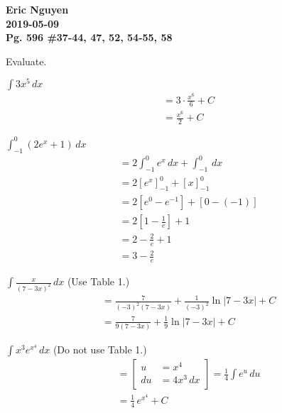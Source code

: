 \documentclass[12pt]{article}
\newenvironment{problem}[2][]{
    \begin{trivlist}
        \item[
            {\bfseries #1}
            {\bfseries #2.}
        ]
}{\end{trivlist}}
\newcommand{\assignment}{Pg. 596 \#37-44, 47, 52, 54-55, 58}
\newcommand{\name}{Eric Nguyen}
\newcommand{\duedate}{2019-05-09}
\newcommand{\details}{\noindent\textbf{\name \\\duedate \\\assignment}}
\newcommand{\Problem}[1]{\bigskip \noindent #1}
\newcommand{\dx}{\, dx}
\newcommand{\du}{\, du}
\newcommand{\subu}[2]{
\left[
\begin{alignedat}{1}
u &= #1 \\
du &= #2 \\
\end{alignedat}
\right] 
}
\begin{document}
\details

\Problem{Evaluate.}

\begin{problem}{37}
    $\displaystyle\int 3x^5 \dx$
    \begin{align}
        &= 3 \cdot \frac{x^6}{6} + C \\
        &= \frac{x^6}{2} + C
    \end{align}
\end{problem}

\begin{problem}{38}
    $\displaystyle\int_{-1}^0 \left(2e^x + 1\right) \dx$
    \begin{align}
        &= 2 \int_{-1}^0 e^x \dx + \int_{-1}^0 \dx \\
        &= 2 \left[e^x\right]_{-1}^0 + \left[x\right]_{-1}^0 \\
        &= 2 \left[e^0 - e^{-1}\right] + [0 - (-1)] \\
        &= 2 \left[1 - \frac{1}{e}\right] + 1 \\
        &= 2 - \frac{2}{e} + 1 \\
        &= 3 - \frac{2}{e}
    \end{align}
\end{problem}

\begin{problem}{39}
    $\displaystyle\int \frac{x}{\left(7 - 3x\right)^2} \dx$ \quad (Use Table 1.)
    \begin{align}
        &= \frac{7}{\left(-3\right)^2 \left(7 - 3x\right)} + \frac{1}{\left(-3\right)^2} \ln \left|7 - 3x\right| + C \\
        &= \frac{7}{9 \left(7 - 3x\right)} + \frac{1}{9} \ln \left|7 - 3x\right| + C 
    \end{align}
\end{problem}

\begin{problem}{40}
    $\displaystyle\int x^3 e^{x^4} \dx$ \quad (Do not use Table 1.)
    \begin{align}
        &= \subu{x^4}{4x^3 \dx} = \frac{1}{4} \int e^u \du \\
        &= \frac{1}{4} \, e^{x^4} + C
    \end{align}
\end{problem}
\end{document}
